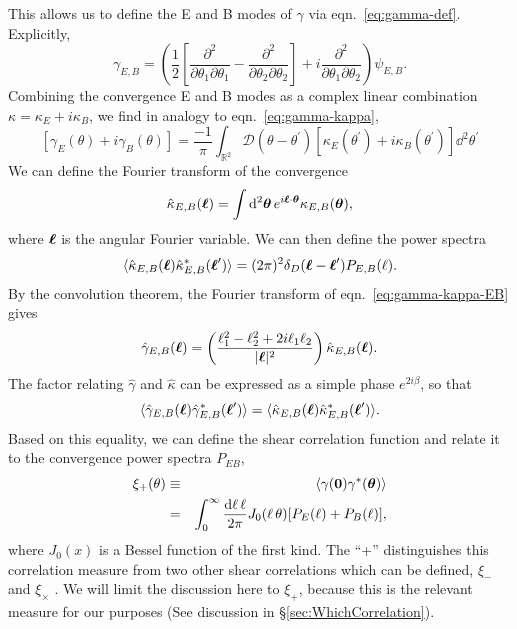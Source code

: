 This allows us to define the E and B modes of $\gamma$ via
eqn.~\ref{eq:gamma-def}.  Explicitly,
\begin{equation}
  \gamma_{E,B} = \left(\frac{1}{2}\left[\frac{\partial^2}{\partial \theta_1\partial\theta_1}
  - \frac{\partial^2}{\partial \theta_2\partial\theta_2}\right]
  + i\frac{\partial^2}{\partial \theta_1\partial\theta_2}\right)
  \psi_{E,B}.
\end{equation}
Combining the convergence E and B modes as a complex linear combination
$\kappa = \kappa_E + i\kappa_B$, we find in analogy to
eqn.~\ref{eq:gamma-kappa},
\begin{equation}
  \label{eq:gamma-kappa-EB}
  \left[\gamma_E(\theta) + i\gamma_B(\theta)\right]
  = \frac{-1}{\pi}\int_{\mathbb{R}^2} \mathcal{D}(\theta - 
  \theta^\prime)
  \left[\kappa_E(\theta^\prime) + i\kappa_B(\theta^\prime)\right]
  \dd^2\theta^\prime
\end{equation}
We can define the Fourier transform of the convergence
\begin{equation}
  \hat{\kappa}_{E,B}(\boldsymbol{\ell})
  = \int\mathrm{d}^2\boldsymbol{\theta}\,e^{i\boldsymbol{\ell}\cdot\boldsymbol{\theta}}
  \kappa_{E,B}(\boldsymbol{\theta}),
\end{equation}
where $\boldsymbol{\ell}$ is the angular Fourier variable.  We can then define
the power spectra \citep[e.g.][]{Schneider02b}
\begin{eqnarray}
  \langle\hat{\kappa}_{E, B}(\boldsymbol{\ell})
  \hat{\kappa}^\ast_{E,B}(\boldsymbol{\ell}^\prime)\rangle
  =(2\pi)^2\delta_D(\boldsymbol{\ell} - \boldsymbol{\ell}^\prime)P_{E,B}(\ell).
\end{eqnarray}
By the convolution theorem, the
Fourier transform of eqn.~\ref{eq:gamma-kappa-EB} gives
\begin{equation}
  \hat{\gamma}_{E,B}(\boldsymbol{\ell})
  =\left(\frac{\ell_1^2 - \ell_2^2 + 2i\ell_1\ell_2}{|\boldsymbol{\ell}|^2}\right)
  \hat{\kappa}_{E,B}(\boldsymbol{\ell}).
\end{equation}
The factor relating $\hat{\gamma}$ and $\hat{\kappa}$ can be expressed
as a simple phase $e^{2i\beta}$, so that
\begin{equation}
  \langle\hat{\gamma}_{E, B}(\boldsymbol{\ell})
  \hat{\gamma}^\ast_{E,B}(\boldsymbol{\ell}^\prime)\rangle = 
  \langle\hat{\kappa}_{E, B}(\boldsymbol{\ell})
  \hat{\kappa}^\ast_{E,B}(\boldsymbol{\ell}^\prime)\rangle.
\end{equation}
Based on this equality, we can define the shear correlation function
and relate it to the convergence power spectra $P_{EB}$,
\begin{eqnarray}
  \label{eq:xi_plus}
  \xi_+(\theta)
  &\equiv& \langle\gamma(\boldsymbol{0})\gamma^\ast(\boldsymbol{\theta})\rangle\nonumber\\
  &=& \int_0^\infty\frac{\mathrm{d}\ell\,\ell}{2\pi}J_0(\ell\,\theta)
     [P_E(\ell) + P_B(\ell)],
\end{eqnarray}
where $J_0(x)$ is a Bessel function of the first kind.
The ``+'' distinguishes this correlation measure from two other shear
correlations which can be defined, $\xi_-$ and $\xi_\times$
\citep[see][for details]{Schneider02}.
We will limit the discussion here to $\xi_+$, because this is the relevant
measure for our purposes (See discussion in \S\ref{sec:WhichCorrelation}).

